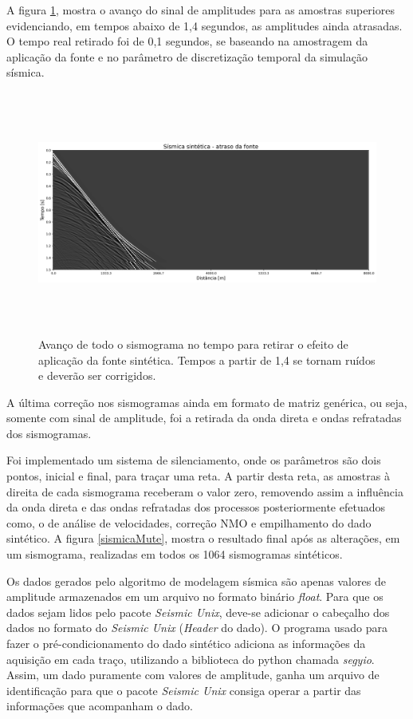 \documentclass[
	12pt,				%
	openright,			%
	oneside,			%
	a4paper,			%
	english,			%
	brazil				%
	]{abntex2}
\begin{document}
	\newpage
	A figura \ref{sismicaLag}, mostra o avanço do sinal de amplitudes para as amostras superiores evidenciando, em tempos abaixo de 1,4 segundos, as amplitudes ainda atrasadas. O tempo real retirado foi de 0,1 segundos, se baseando na amostragem da aplicação da fonte e no parâmetro de discretização temporal da simulação sísmica.

	\begin{figure}[htp!]
		\centering
		\includegraphics[width=16cm,height=8cm]{../imagens/sismicaLag.png}
		\caption{Avanço de todo o sismograma no tempo para retirar o efeito de aplicação da fonte sintética. Tempos a partir de 1,4 se tornam ruídos e deverão ser corrigidos.}
		\label{sismicaLag}
	\end{figure}

	A última correção nos sismogramas ainda em formato de matriz genérica, ou seja, somente com sinal de amplitude, foi a retirada da onda direta e ondas refratadas dos sismogramas. 
	
	Foi implementado um sistema de silenciamento, onde os parâmetros são dois pontos, inicial e final, para traçar uma reta. A partir desta reta, as amostras à direita de cada sismograma receberam o valor zero, removendo assim a influência da onda direta e das ondas refratadas dos processos posteriormente efetuados como, o de análise de velocidades, correção NMO e empilhamento do dado sintético. A figura \ref{sismicaMute}, mostra o resultado final após as alterações, em um sismograma, realizadas em todos os 1064 sismogramas sintéticos. 		

	Os dados gerados pelo algoritmo de modelagem sísmica são apenas valores de amplitude armazenados em um arquivo no formato binário \textit{float}. Para que os dados sejam lidos pelo pacote \textit{Seismic Unix}, deve-se adicionar o cabeçalho dos dados no formato do \textit{Seismic Unix} (\textit{Header} do dado). O programa usado para fazer o pré-condicionamento do dado sintético adiciona as informações da aquisição em cada traço, utilizando a biblioteca do python chamada \textit{segyio}. Assim, um dado puramente com valores de amplitude, ganha um arquivo de identificação para que o pacote \textit{Seismic Unix} consiga operar a partir das informações que acompanham o dado.
	
\end{document}
